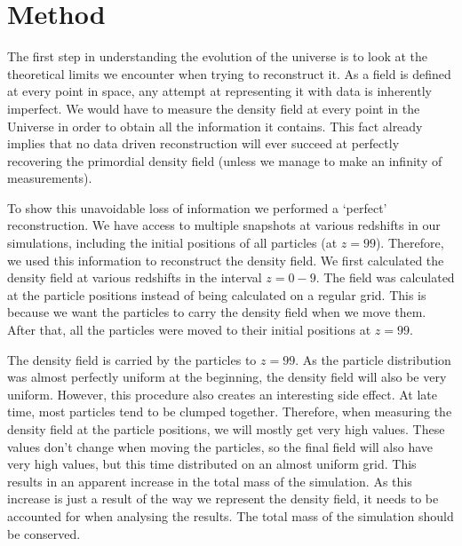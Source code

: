 

\section{Method}


The first step in understanding the evolution of the universe is to look at the theoretical limits we encounter when trying to reconstruct it. As a field is defined at every point in space, any attempt at representing it with data is inherently imperfect. We would have to measure the density field at every point in the Universe in order to obtain all the information it contains. This fact already implies that no data driven reconstruction will ever succeed at perfectly recovering the primordial density field (unless we manage to make an infinity of measurements). 

To show this unavoidable loss of information we performed a `perfect' reconstruction. We have access to multiple snapshots at various redshifts in our simulations, including the initial positions of all particles (at $z = 99$). Therefore, we used this information to reconstruct the density field. We first calculated the density field at various redshifts in the interval $z = 0 - 9$. The field was calculated at the particle positions instead of being calculated on a regular grid. This is because we want the particles to carry the density field when we move them. After that, all the particles were moved to their initial positions at $z = 99$.

The density field is carried by the particles to $z = 99$. As the particle distribution was almost perfectly uniform at the beginning, the density field will also be very uniform. However, this procedure also creates an interesting side effect. At late time, most particles tend to be clumped together. Therefore, when measuring the density field at the particle positions, we will mostly get very high values. These values don't change when moving the particles, so the final field will also have very high values, but this time distributed on an almost uniform grid. This results in an apparent increase in the total mass of the simulation. As this increase is just a result of the way we represent the density field, it needs to be accounted for when analysing the results. The total mass of the simulation should be conserved. 

